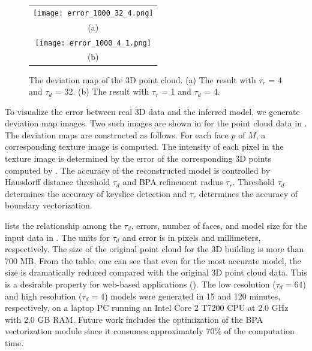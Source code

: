 \begin{figure} [htbp]
\begin{center}
\begin{tabular}{c}
\texttt{[image: error\_1000\_32\_4.png]} \\
(a) \\
\texttt{[image: error\_1000\_4\_1.png]} \\
(b)
\end{tabular}
\end{center}
\caption{The deviation map of the 3D point cloud. (a) The result with $\tau_r$ = 4 and $\tau_d$ = 32.
(b) The result with $\tau_r$ = 1 and $\tau_d$ = 4. }
\label{fig:EM}
\end{figure}

To visualize the error between real 3D data and the inferred model,
we generate deviation map images.
Two such images are shown in  for the point cloud data in
.
The deviation maps are constructed as follows.
For each face $p$ of $M$, a corresponding texture image is computed.
The intensity of each pixel in the texture image is determined by the error
of the corresponding 3D points computed by .
The accuracy of the reconstructed model is controlled by Hausdorff distance
threshold $\tau_d$ and BPA refinement radius $\tau_r$.
Threshold $\tau_d$ determines the accuracy of keyslice detection and $\tau_r$
determines the accuracy of boundary vectorization.

 lists the relationship among the $\tau_d$, errors,
number of faces, and model size for the input data in .
The units for $\tau_d$ and error is in pixels and millimeters, respectively.
The size of the original point cloud for the 3D building is more than 700 MB.
From the table, one can see that even for the most accurate model, the size
is dramatically reduced compared with the original 3D point cloud data.
This is a desirable property for web-based applications ().
The low resolution ($\tau_d = 64$) and high resolution ($\tau_d = 4$) models
were generated in 15 and 120 minutes, respectively,
on a laptop PC running an Intel Core 2 T7200 CPU at 2.0 GHz with 2.0 GB RAM.
Future work includes the optimization of the BPA vectorization module since
it consumes approximately 70\% of the computation time.

